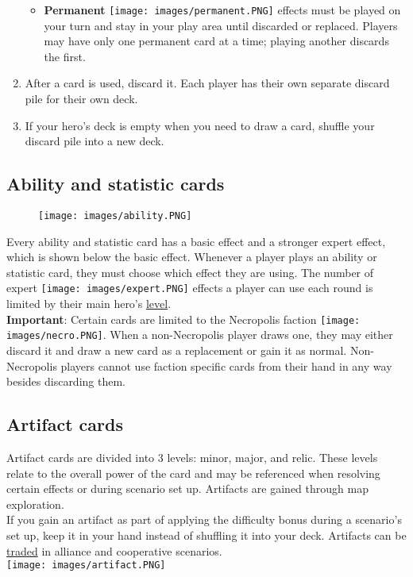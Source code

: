 \documentclass[12pt]{article}
\begin{document}
\begin{enumerate}
\begin{itemize}
        \item \textbf{Permanent} \texttt{[image: images/permanent.PNG]} effects must be played on your turn and stay in your play area until discarded or replaced. Players may have only one permanent card at a time; playing another discards the first.
    \end{itemize}
    \item After a card is used, discard it. Each player has their own separate discard pile for their own deck.
    \item If your hero's deck is empty when you need to draw a card, shuffle your discard pile into a new deck.
\end{enumerate}

\clearpage
\subsection*{\hypertarget{Ability}{Ability and statistic cards}}
\begin{wrapfigure}{R}{0.5\textwidth}
 
    \texttt{[image: images/ability.PNG]}

\end{wrapfigure}
Every ability and statistic card has a basic effect and a stronger expert effect, which is shown below the basic effect. Whenever a player plays an ability or statistic card, they must choose which effect they are using. The number of expert \texttt{[image: images/expert.PNG]} effects a player can use each round is limited by their main hero’s \hyperlink{Level}{level}.\\[6pt]
\textbf{Important}: Certain cards are limited to the Necropolis faction \texttt{[image: images/necro.PNG]}. When a non-Necropolis player draws one, they may either discard it and draw a new card as a replacement or gain it as normal. Non-Necropolis players cannot use faction specific cards from their hand in any way besides discarding them.
\subsection*{Artifact cards}
Artifact cards are divided into 3 levels: minor, major, and relic. These levels relate to the overall power of the card and may be referenced when resolving certain effects or during scenario set up. Artifacts are gained through map exploration.\\[6pt]
If you gain an artifact as part of applying the difficulty bonus during a scenario’s set up, keep it in your hand instead of shuffling it into your deck.
Artifacts can be \hyperlink{Trading}{traded} in alliance and cooperative scenarios.\\[6pt]
\texttt{[image: images/artifact.PNG]}
\end{document}
